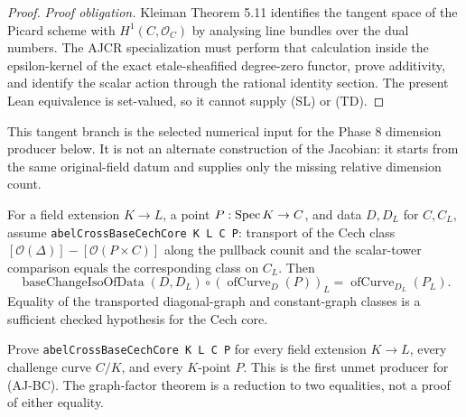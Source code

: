 \begin{proof}
  \emph{Proof obligation.}  Kleiman Theorem 5.11 identifies
  the tangent space of the Picard scheme with \(H^1(C,\mathcal O_C)\) by
  analysing line bundles over the dual numbers.  The AJCR specialization must
  perform that calculation inside the epsilon-kernel of the exact
  etale-sheafified degree-zero functor, prove additivity, and identify the
  scalar action through the rational identity section.  The present Lean
  equivalence is set-valued, so it cannot supply (SL) or (TD).
\end{proof}

This tangent branch is the selected numerical input for the Phase 8 dimension
producer below.  It is not an alternate construction of the Jacobian: it starts
from the same original-field datum and supplies only the missing relative
dimension count.

\begin{theorem}
  \label{route-thm-abel-basechange-conditional}
  \leanok

  For a field extension \(K\to L\), a point \(P:\operatorname{Spec} K\to C\), and data
  \(D,D_L\) for \(C,C_L\), assume
  \texttt{abelCrossBaseCechCore K L C P}: transport of the Cech class
  \([\mathcal O(\Delta)]-[\mathcal O(P\times C)]\) along the pullback counit
  and the scalar-tower comparison equals the corresponding class on \(C_L\).
  Then
  \[
    \operatorname{baseChangeIsoOfData}(D,D_L)\circ
      (\operatorname{ofCurve}_D(P))_L
      =\operatorname{ofCurve}_{D_L}(P_L).
    \tag{AJ-BC}
  \]
  Equality of the transported diagonal-graph and constant-graph classes is a
  sufficient checked hypothesis for the Cech core.
\end{theorem}

\begin{theorem}
  \label{route-thm-abel-basechange-core}
  \notready

  Prove \texttt{abelCrossBaseCechCore K L C P} for every field extension
  \(K\to L\), every challenge curve \(C/K\), and every \(K\)-point \(P\).
  This is the first unmet producer for (AJ-BC).  The graph-factor theorem is a
  reduction to two equalities, not a proof of either equality.
\end{theorem}

